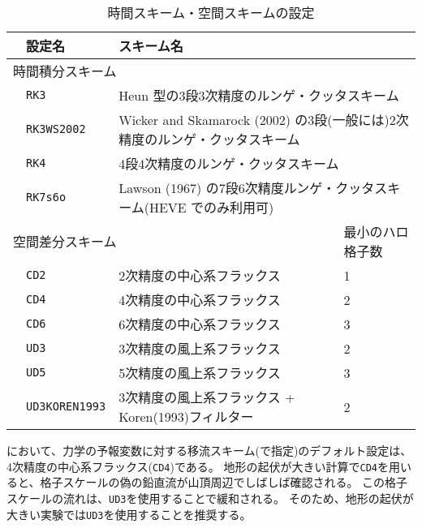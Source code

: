 \begin{table}[h]
\begin{center}
  \caption{時間スキーム・空間スキームの設定}
  \label{tab:nml_atm_dyn}
  \begin{tabularx}{150mm}{llXX} \hline
    \rowcolor[gray]{0.9} & \multicolumn{1}{l}{設定名} & \multicolumn{1}{l}{スキーム名} & \\ \hline
    \multicolumn{3}{l}{時間積分スキーム} &  \\ \hline
    & \multicolumn{1}{l}{\verb|RK3|} & \multicolumn{2}{l}{Heun 型の3段3次精度のルンゲ・クッタスキーム} \\
    & \multicolumn{1}{l}{\verb|RK3WS2002|} & \multicolumn{2}{l}{Wicker and Skamarock (2002) の3段(一般には)2次精度のルンゲ・クッタスキーム} \\
    & \multicolumn{1}{l}{\verb|RK4|} & \multicolumn{2}{l}{4段4次精度のルンゲ・クッタスキーム} \\
    & \multicolumn{1}{l}{\verb|RK7s6o|} & \multicolumn{2}{l}{Lawson (1967) の7段6次精度ルンゲ・クッタスキーム(HEVE でのみ利用可)} \\
    \hline
    \multicolumn{3}{l}{空間差分スキーム} & 最小のハロ格子数\\ \hline
    & \multicolumn{1}{l}{\verb|CD2|} & \multicolumn{1}{l}{2次精度の中心系フラックス} & \multicolumn{1}{l}{1}\\
    & \multicolumn{1}{l}{\verb|CD4|} & \multicolumn{1}{l}{4次精度の中心系フラックス} & \multicolumn{1}{l}{2}\\
    & \multicolumn{1}{l}{\verb|CD6|} & \multicolumn{1}{l}{6次精度の中心系フラックス} & \multicolumn{1}{l}{3}\\
    & \multicolumn{1}{l}{\verb|UD3|} & \multicolumn{1}{l}{3次精度の風上系フラックス} & \multicolumn{1}{l}{2}\\
    & \multicolumn{1}{l}{\verb|UD5|} & \multicolumn{1}{l}{5次精度の風上系フラックス} & \multicolumn{1}{l}{3}\\
    & \multicolumn{1}{l}{\verb|UD3KOREN1993|} & \multicolumn{1}{X}{3次精度の風上系フラックス + Koren(1993)フィルター} & \multicolumn{1}{l}{2}\\
\hline
  \end{tabularx}
\end{center}
\end{table}

\scalerm において、力学の予報変数に対する移流スキーム(で指定)のデフォルト設定は、
4次精度の中心系フラックス(\verb|CD4|)である。
地形の起伏が大きい計算で\verb|CD4|を用いると、格子スケールの偽の鉛直流が山頂周辺でしばしば確認される。
この格子スケールの流れは、\verb|UD3|を使用することで緩和される。
そのため、地形の起伏が大きい実験では\verb|UD3|を使用することを推奨する。

